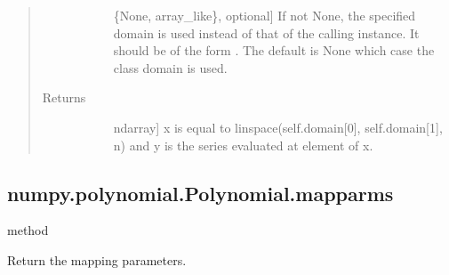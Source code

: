 \documentclass[letterpaper,10pt,english]{sphinxmanual}
\begin{document}
\begin{fulllineitems}
\begin{fulllineitems}
\begin{quote}
\begin{description}
\begin{description}
\item[{}] \leavevmode{[}\{None, array\_like\}, optional{]}
If not None, the specified domain is used instead of that of
the calling instance. It should be of the form .
The default is None which case the class domain is used.

\end{description}

\item[{Returns}] \leavevmode\begin{description}
\item[{}] \leavevmode{[}ndarray{]}
x is equal to linspace(self.domain{[}0{]}, self.domain{[}1{]}, n) and
y is the series evaluated at element of x.

\end{description}

\end{description}\end{quote}

\end{fulllineitems}



\subsection{numpy.polynomial.Polynomial.mapparms}
\label{\detokenize{generated/generated/numpy.polynomial.Polynomial.mapparms:numpy-polynomial-polynomial-mapparms}}\label{\detokenize{generated/generated/numpy.polynomial.Polynomial.mapparms::doc}}
method

\begin{fulllineitems}
\label{\detokenize{generated/generated/numpy.polynomial.Polynomial.mapparms:numpy.polynomial.Polynomial.mapparms}}
Return the mapping parameters.


\end{fulllineitems}
\end{fulllineitems}
\end{document}
